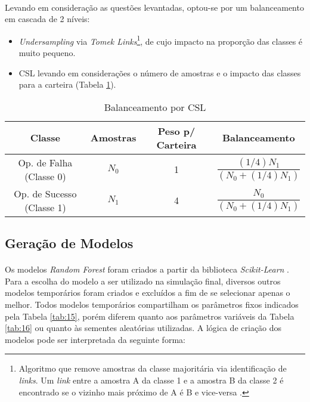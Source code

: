 \paragraph{} Levando em consideração as questões levantadas, optou-se por um balanceamento em cascada de 2 níveis:

\begin{itemize}
    \item \textit{Undersampling} via \textit{Tomek Links}\footnote{Algoritmo que remove amostras da classe majoritária via identificação de \textit{links}. Um \textit{link} entre a amostra A da classe 1 e a amostra B da classe 2 é encontrado se o vizinho mais próximo de A é B e vice-versa \cite{he2013imbalanced}.}, de cujo impacto na proporção das classes é muito pequeno.
    \item CSL levando em considerações o número de amostras e o impacto das classes para a carteira (Tabela \ref{tab:8}).
\end{itemize}

\begin{table}[h!]
    \begin{center}
        \begin{tabular}{ c|c|c|c }
            Classe & Amostras & Peso p/ Carteira & Balanceamento \\
            \hline
            Op. de Falha (Classe 0) & \begin{math} N_0 \end{math} & 1 & \begin{math} \dfrac{(1/4)N_1}{(N_0+(1/4)N_1)} \end{math} \\
            Op. de Sucesso (Classe 1) & \begin{math} N_1 \end{math} & 4 & \begin{math} \dfrac{N_0}{(N_0+(1/4)N_1)} \end{math} \\
        \end{tabular}
        \caption{Balanceamento por CSL}
        \label{tab:8}
    \end{center}
\end{table}


\FloatBarrier
\subsection{Geração de Modelos}

\paragraph{} Os modelos \textit{Random Forest} foram criados a partir da biblioteca \textit{Scikit-Learn} \cite{scikit}. Para a escolha do modelo a ser utilizado na simulação final, diversos outros modelos temporários foram criados e excluídos a fim de se selecionar apenas o melhor. Todos modelos temporários compartilham os parâmetros fixos indicados pela Tabela \ref{tab:15}, porém diferem quanto aos parâmetros variáveis da Tabela \ref{tab:16} ou quanto às sementes aleatórias utilizadas. A lógica de criação dos modelos pode ser interpretada da seguinte forma:

